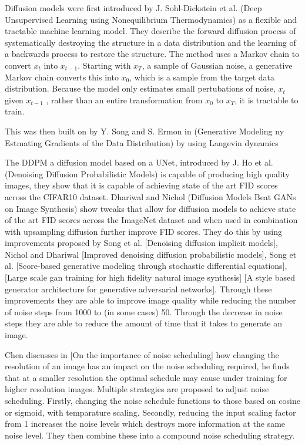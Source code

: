 \documentclass{UoYCSproject}
\begin{document}
Diffusion models were first introduced by J. Sohl-Dickstein et al. (Deep Unsupervised Learning using Nonequilibrium Thermodynamics) as a flexible and tractable machine learning model. They describe the forward diffusion process of systematically destroying the structure in a data distribution and the learning of a backwards process to restore the structure. The method uses a Markov chain to convert $ x_t $ into $ x_{t-1} $. Starting with $ x_T $, a sample of Gaussian noise, a generative Markov chain converts this into $ x_0 $, which is a sample from the target data distribution. Because the model only estimates small pertubations of noise, $ x_t $ given $ x_{t-1} $ , rather than an entire transformation from $ x_0 $ to $ x_T $, it is tractable to train. 

This was then built on by Y. Song and S. Ermon in (Generative Modeling ny Estmating Gradients of the Data Distribution) by using Langevin dynamics 

The DDPM a diffusion model based on a UNet, introduced by J. Ho et al. (Denoising Diffusion Probabilistic Models) is capable of producing high quality images, they show that it is capable of achieving state of the art FID scores across the CIFAR10 dataset. Dhariwal and Nichol (Diffusion Models Beat GANs on Image Synthesis) show tweaks that allow for diffusion models to achieve state of the art FID scores across the ImageNet dataset and when used in combination with upsampling diffusion further improve FID scores. They do this by using improvements proposed by Song et al. [Denoising diffusion implicit models], Nichol and Dhariwal [Improved denoising diffusion probabilistic models], Song et al. [Score-based generative modeling through stochastic differential equations], [Large scale gan training for high fidelity natural image synthesis] [A style based generator architecture for generative adversarial networks]. Through these improvements they are able to improve image quality while reducing the number of noise steps from 1000 to (in some cases) 50. Through the decrease in noise steps they are able to reduce the amount of time that it takes to generate an image.  


Chen discusses in [On the importance of noise scheduling] how changing the resolution of an image has an impact on the noise scheduling required, he finds that at a smaller resolution the optimal schedule may cause under training for higher resolution images. Multiple strategies are proposed to adjust noise scheduling. Firstly, changing the noise schedule functions to those based on cosine or sigmoid, with temparature scaling. Secondly, reducing the input scaling factor from 1 increases the noise levels which destroys more information at the same noise level. They then combine these into a compound noise scheduling strategy.
\end{document}
